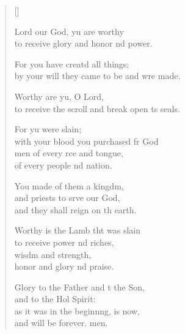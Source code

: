 \settowidth{\versewidth}{to receive the scroll and break open its seals.}
\begin{verse}[\versewidth]
  \begin{patverse}
 Lord our God, yu are worthy\Med\\
to receive glory and honor nd power.

For you have creatd all things;\Med\\
by your will they came to be and wre made.

Worthy are yu, O Lord,\Med\\
to receive the scroll and break open \pointup{\i}ts seals.

For yu were slain;\Med\\
with your blood you purchased fr God\\
men of every rce and tongue,\Med\\
of every people nd nation.

You made of them a kingdm,\Flex\\
and priests to srve our God,\Med\\
and they shall reign on th earth.

Worthy is the Lamb tht was slain\Med\\
to receive power nd riches,\Med\\
wisdm and strength,\\
honor and glory nd praise.

Glory to the Father and t the Son,\Med\\
and to the Hol Spirit:\\
as it was in the beginnng, is now,\Med\\
and will be forever. men.
  \end{patverse}
\end{verse}
